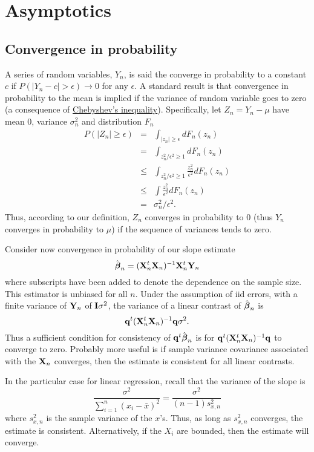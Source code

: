 \chapter{Asymptotics}

\section{Convergence in probability}
A series of random variables, $Y_n$, is said the converge in probability to 
a constant $c$ if $P( | Y_n - c| > \epsilon) \rightarrow 0$ for any $\epsilon$. 
A standard result is that convergence in probability to the mean is implied if the
variance of random variable goes to zero (a consequence of \href{https://en.wikipedia.org/wiki/Chebyshev%27s_inequality}{Chebyshev's inequality}).
Specifically, let $Z_n = Y_n - \mu$ have mean $0$, variance 
$\sigma^2_n$
and distribution $F_n$
\begin{eqnarray*}
P( |Z_n | \geq  \epsilon) & = & 
\int_{|z_n | \geq \epsilon} dF_n (z_n) \\
& =  & 
\int_{z_n^2 / \epsilon^2 \geq 1} dF_n (z_n) \\
& \leq & \int_{z_n^2 / \epsilon^2 \geq 1} \frac{z_n^2}{\epsilon^2} dF_n (z_n)\\
& \leq & \int \frac{z_n^2}{\epsilon^2} dF_n (z_n)\\
& = & \sigma^2_n / \epsilon^2.
\end{eqnarray*}
Thus, according to our definition, $Z_n$ converges in probability 
to 0 (thus $Y_n$ converges in probability to $\mu$) if the
sequence of variances tends to zero. 

Consider now convergence in probability of our slope estimate
$$
\hat {\boldsymbol{\beta}}_n = (\mathbf{X}_n^t \mathbf{X}_n)^{-1}\mathbf{X}_n^t  \mathbf{Y}_n
$$
where subscripts have been added to denote the dependence on the sample size.
This estimator is unbiased for all $n$.
Under the assumption of iid errors, with a finite variance of $\mathbf{Y}_n$
of $\mathbf{I} \sigma^2$, the variance of a linear contrast of $\hat {\boldsymbol{\beta}}_n$ is
$$
\mathbf{q}^t (\mathbf{X}_n^t \mathbf{X}_n)^{-1} \mathbf{q} \sigma^2.
$$
Thus a sufficient condition for consistency of $\mathbf{q}^t \hat {\boldsymbol{\beta}}_n$ is 
for $\mathbf{q}^t (\mathbf{X}_n^t \mathbf{X}_n)^{-1} \mathbf{q}$ to converge to zero. Probably more
useful is if sample variance covariance associated with the $\mathbf{X}_n$ converges,
then the estimate is consistent for all linear contrasts.

In the particular case for linear regression, recall that the variance of the slope
is 
$$
\frac{\sigma^2}{\sum_{i=1}^n (x_{i} - \bar{x})^2} =
\frac{\sigma^2}{(n-1) s^2_{x,n}}
$$
where $s^2_{x,n}$ is the sample variance of the $x$'s. Thus, as long as
$s_{x,n}^2$ converges, the estimate is consistent. Alternatively,
if the $X_i$ are bounded, then the estimate will converge. 



